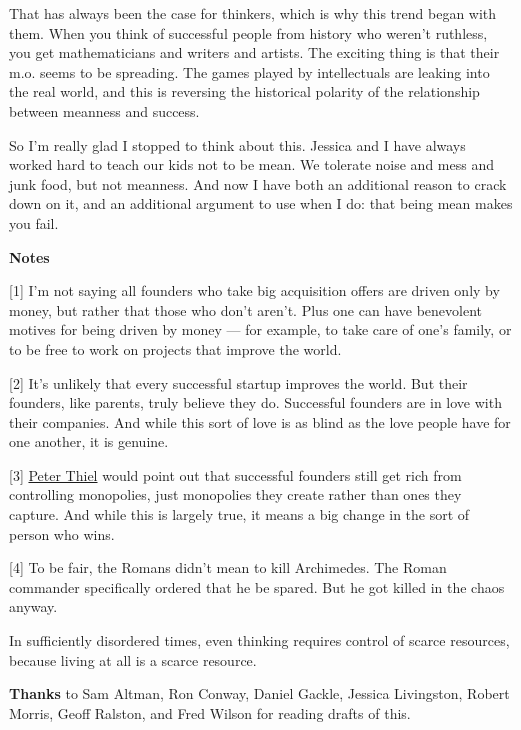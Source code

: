 That has always been the case for thinkers, which is why this trend
began with them.  When you think of successful people from history
who weren't ruthless, you get mathematicians and writers and artists.
The exciting thing is that their m.o. seems to be spreading.  The
games played by intellectuals are leaking into the real world, and
this is reversing the historical polarity of the relationship between
meanness and success.

So I'm really glad I stopped to think about this. Jessica and I
have always worked hard to teach our kids not to be mean.  We
tolerate noise and mess and junk food, but not meanness.  And now
I have both an additional reason to crack down on it, and an
additional argument to use when I do: that being mean makes you
fail.








\textbf{Notes}

[1]
I'm not saying all founders who take big acquisition offers
are driven only by money, but rather that those who don't aren't.
Plus one can have benevolent motives for being driven by money --- for 
example, to take care of one's family, or to be free to work
on projects that improve the world.

[2]
It's unlikely that every successful startup improves the
world.  But their founders, like parents, truly believe they do.
Successful founders are in love with their companies.  And while
this sort of love is as blind as the love people have for one
another, it is genuine.

[3]
\href{http://startupclass.samaltman.com/courses/lec05}{Peter 
Thiel} would point out that successful founders still
get rich from controlling monopolies, just monopolies they create
rather than ones they capture.  And while this is largely true, it
means a big change in the sort of person who wins.

[4]
To be fair, the Romans didn't mean to kill Archimedes.  The
Roman commander specifically ordered that he be spared. But he got
killed in the chaos anyway.

In sufficiently disordered times, even thinking requires
control of scarce resources, because living at all is a scarce
resource.



\textbf{Thanks} to Sam Altman, Ron Conway, Daniel Gackle, Jessica Livingston, Robert Morris,
Geoff Ralston, and Fred Wilson for reading drafts of this.


